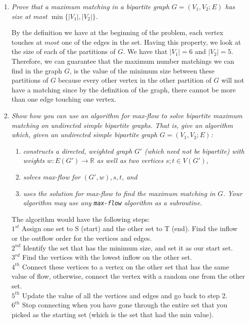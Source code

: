 \documentclass[12pt]{article} \setlength{\oddsidemargin}{0in}
\begin{document}
\begin{enumerate} 
\item\textit{Prove that a maximum matching in a bipartite graph $G = (V_1, V_2; E)$ has size at most $\min\{|V_1|,|V_2|\}$.}

By the definition we have at the beginning of the problem, each vertex touches at $most$ one of the edges in the set. Having this property, we look at the size of each of the partitions of $G$. We have that $|V_1| = 6$ and $|V_2| = 5$. Therefore, we can guarantee that the maximum number matchings we can find in the graph $G$, is the value of the minimum size between these partitions of $G$ because every other vertex in the other partition of $G$ will not have a matching since by the definition of the graph, there cannot be more than one edge touching one vertex. 


\item\textit{Show how you can use an algorithm for max-flow to solve bipartite maximum %
matching on undirected simple bipartite graphs. That is, give an algorithm which, given an undirected simple bipartite graph $G = (V_1, V_2; E)$:}
\begin{enumerate}[label = (\arabic*)]
\item\textit{constructs a directed, weighted graph $G'$ (which need not be bipartite) with weights $w : E(G') \rightarrow \mathbb{R}$ as well as two vertices $s; t \in V(G')$,}
\item\textit{solves max-flow for $(G',w), s, t$, and}
\item\textit{uses the solution for max-flow to find the maximum matching in $G$. Your algorithm may use any \texttt{max-flow} algorithm as a subroutine.}
\end{enumerate}

The algorithm would have the following steps: \\
$1^{st}$ Assign one set to S (start) and the other set to T (end). Find the inflow or the outflow order for the vertices and edges.  \\
$2^{nd}$ Identify the set that has the minimum size, and set it as our start set. \\
$3^{rd}$ Find the vertices with the lowest inflow on the other set. \\
$4^{th}$ Connect these vertices to a vertex on the other set that has the same value of flow, otherwise, connect the vertex with a random one from the other set. \\
$5^{th}$ Update the value of all the vertices and edges and go back to step 2. \\
$6^{th}$ Stop connecting when you have gone through the entire set that you picked as the starting set (which is the set that had the min value). 



\end{enumerate}
\end{document}

